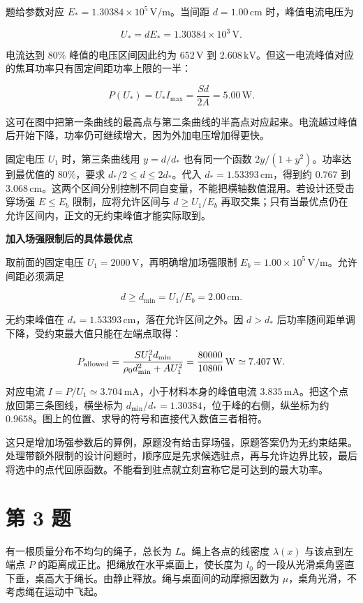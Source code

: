 \documentclass[12pt,a4paper,UTF8]{ctexart}
\begin{document}
题给参数对应 \(E_*=1.30384\times10^5\,\mathrm{V/m}\)。当间距
\(d=1.00\,\mathrm{cm}\) 时，峰值电流电压为

\[U_*=dE_*=1.30384\times10^3\,\mathrm V.\]

电流达到 \(80\%\) 峰值的电压区间因此约为 \(652\,\mathrm V\) 到
\(2.608\,\mathrm{kV}\)。但这一电流峰值对应的焦耳功率只有固定间距功率上限的一半：

\[P(U_*)=U_*I_{\max}=\frac{Sd}{2A}=5.00\,\mathrm W.\]

这可在图中把第一条曲线的最高点与第二条曲线的半高点对应起来。电流越过峰值后开始下降，功率仍可继续增大，因为外加电压增加得更快。

固定电压 \(U_1\) 时，第三条曲线用 \(y=d/d_*\) 也有同一个函数
\(2y/(1+y^2)\)。功率达到最优值的 \(80\%\)，要求
\(d_*/2\le d\le2d_*\)。代入 \(d_*=1.53393\,\mathrm{cm}\)，得到约
\(0.767\) 到
\(3.068\,\mathrm{cm}\)。这两个区间分别控制不同自变量，不能把横轴数值混用。若设计还受击穿场强
\(E\le E_b\) 限制，应将允许区间与 \(d\ge U_1/E_b\)
再取交集；只有当最优点仍在允许区间内，正文的无约束峰值才能实际取到。

\textbf{加入场强限制后的具体最优点}

取前面的固定电压 \(U_1=2000\,\mathrm V\)，再明确增加场强限制
\(E_b=1.00\times10^5\,\mathrm{V/m}\)。允许间距必须满足

\[d\ge d_{\min}=U_1/E_b=2.00\,\mathrm{cm}.\]

无约束峰值在 \(d_*=1.53393\,\mathrm{cm}\)，落在允许区间之外。因
\(d>d_*\) 后功率随间距单调下降，受约束最大值只能在左端点取得：

\[P_{\rm allowed}=\frac{SU_1^2d_{\min}}{\rho_0d_{\min}^2+AU_1^2}=\frac{80000}{10800}\,\mathrm W\simeq7.407\,\mathrm W.\]

对应电流 \(I=P/U_1\simeq3.704\,\mathrm{mA}\)，小于材料本身的峰值电流
\(3.835\,\mathrm{mA}\)。把这个点放回第三条图线，横坐标为
\(d_{\min}/d_*=1.30384\)，位于峰的右侧，纵坐标为约
\(0.9658\)。图上的位置、求导的符号和直接代入数值三者相符。

这只是增加场强参数后的算例，原题没有给击穿场强，原题答案仍为无约束结果。处理带额外限制的设计问题时，顺序应是先求候选驻点，再与允许边界比较，最后将选中的点代回原函数。不能看到驻点就立刻宣称它是可达到的最大功率。

\newpage

\section{第 3 题}\label{ux7b2c-3-ux9898}

有一根质量分布不均匀的绳子，总长为 \(L\)。绳上各点的线密度
\(\lambda(x)\) 与该点到左端点 \(P\)
的距离成正比。把绳放在水平桌面上，使长度为 \(l_0\)
的一段从光滑桌角竖直下垂，桌高大于绳长。由静止释放。绳与桌面间的动摩擦因数为
\(\mu\)，桌角光滑，不考虑绳在运动中飞起。
\end{document}
